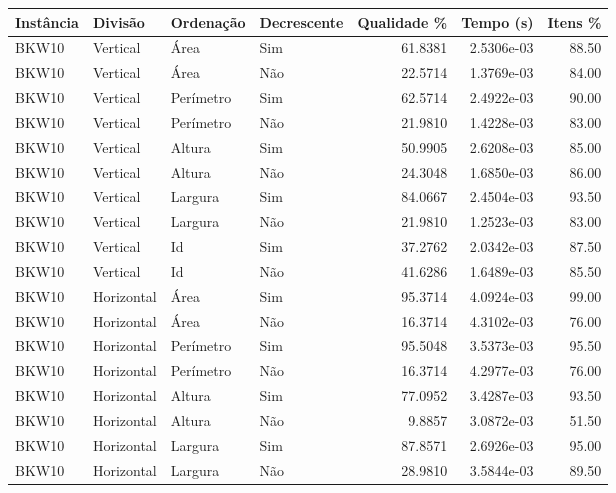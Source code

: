 \begin{tabular}{llllrrr}
    \hline
    Instância & Divisão     & Ordenação & Decrescente & Qualidade \% & Tempo (s)  & Itens \% \\
    \hline
    BKW10     & Vertical    & Área      & Sim         & 61.8381      & 2.5306e-03 & 88.50    \\
    BKW10     & Vertical    & Área      & Não         & 22.5714      & 1.3769e-03 & 84.00    \\
    BKW10     & Vertical    & Perímetro & Sim         & 62.5714      & 2.4922e-03 & 90.00    \\
    BKW10     & Vertical    & Perímetro & Não         & 21.9810      & 1.4228e-03 & 83.00    \\
    BKW10     & Vertical    & Altura    & Sim         & 50.9905      & 2.6208e-03 & 85.00    \\
    BKW10     & Vertical    & Altura    & Não         & 24.3048      & 1.6850e-03 & 86.00    \\
    BKW10     & Vertical    & Largura   & Sim         & 84.0667      & 2.4504e-03 & 93.50    \\
    BKW10     & Vertical    & Largura   & Não         & 21.9810      & 1.2523e-03 & 83.00    \\
    BKW10     & Vertical    & Id        & Sim         & 37.2762      & 2.0342e-03 & 87.50    \\
    BKW10     & Vertical    & Id        & Não         & 41.6286      & 1.6489e-03 & 85.50    \\
    BKW10     & Horizontal  & Área      & Sim         & 95.3714      & 4.0924e-03 & 99.00    \\
    BKW10     & Horizontal  & Área      & Não         & 16.3714      & 4.3102e-03 & 76.00    \\
    BKW10     & Horizontal  & Perímetro & Sim         & 95.5048      & 3.5373e-03 & 95.50    \\
    BKW10     & Horizontal  & Perímetro & Não         & 16.3714      & 4.2977e-03 & 76.00    \\
    BKW10     & Horizontal  & Altura    & Sim         & 77.0952      & 3.4287e-03 & 93.50    \\
    BKW10     & Horizontal  & Altura    & Não         & 9.8857       & 3.0872e-03 & 51.50    \\
    BKW10     & Horizontal  & Largura   & Sim         & 87.8571      & 2.6926e-03 & 95.00    \\
    BKW10     & Horizontal  & Largura   & Não         & 28.9810      & 3.5844e-03 & 89.50    \\

\end{tabular}
